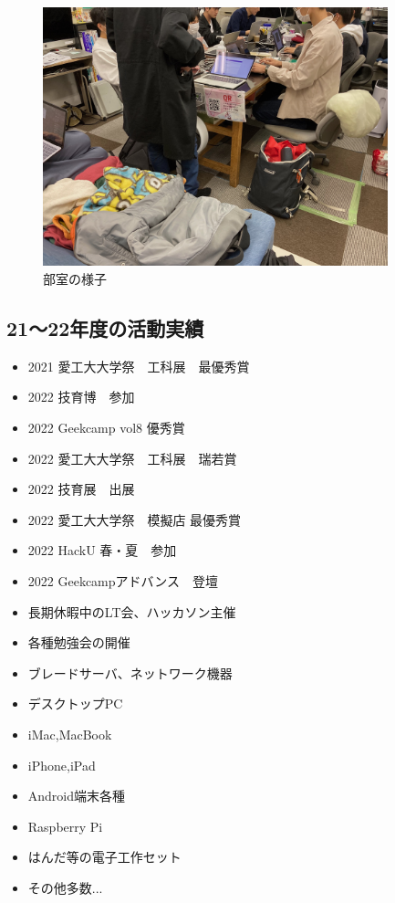 \begin{figure}[bht]
  \centering
  \includegraphics[width=10cm]{./image/02-AboutSysken/room.jpg}
  \caption{部室の様子}
\end{figure}

\subsection{21〜22年度の活動実績}
\begin{itemize}
  \item 2021 愛工大大学祭　工科展　最優秀賞
  \item 2022 技育博　参加
  \item 2022 Geekcamp vol8 優秀賞
  \item 2022 愛工大大学祭　工科展　瑞若賞
  \item 2022 技育展　出展
  \item 2022 愛工大大学祭　模擬店 最優秀賞
  \item 2022 HackU 春・夏　参加
  \item 2022 Geekcampアドバンス　登壇
  \item 長期休暇中のLT会、ハッカソン主催
  \item 各種勉強会の開催
\end{itemize}

\begin{tcolorbox}[title=シス研の設備]
  \begin{itemize}
    \item ブレードサーバ、ネットワーク機器
    \item デスクトップPC
    \item iMac,MacBook
    \item iPhone,iPad
    \item Android端末各種
    \item Raspberry Pi
    \item はんだ等の電子工作セット
    \item その他多数...
  \end{itemize} 
\end{tcolorbox}


